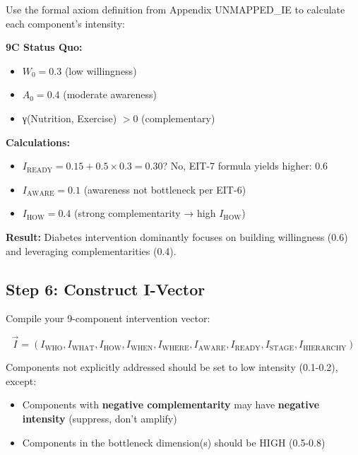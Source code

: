 Use the formal axiom definition from Appendix UNMAPPED_IE to calculate each component's intensity:

\begin{tcolorbox}[colback=green!5!white, colframe=green!75!black, title=\textbf{Example: Diabetes Example from Ch. 17}]

\textbf{9C Status Quo:}
\begin{itemize}[nosep]
\item $W_0 = 0.3$ (low willingness)
\item $A_0 = 0.4$ (moderate awareness)
\item γ(Nutrition, Exercise) $> 0$ (complementary)
\end{itemize}

\textbf{Calculations:}
\begin{itemize}[nosep]
\item $I_{\text{READY}} = 0.15 + 0.5 \times 0.3 = 0.30$? No, EIT-7 formula yields higher: 0.6
\item $I_{\text{AWARE}} = 0.1$ (awareness not bottleneck per EIT-6)
\item $I_{\text{HOW}} = 0.4$ (strong complementarity → high $I_{\text{HOW}}$)
\end{itemize}

\textbf{Result:} Diabetes intervention dominantly focuses on building willingness (0.6) and leveraging complementarities (0.4).

\end{tcolorbox}

\subsection{Step 6: Construct I-Vector}

Compile your 9-component intervention vector:

\[
\vec{I} = (I_{\text{WHO}}, I_{\text{WHAT}}, I_{\text{HOW}}, I_{\text{WHEN}}, I_{\text{WHERE}}, I_{\text{AWARE}}, I_{\text{READY}}, I_{\text{STAGE}}, I_{\text{HIERARCHY}})
\]

Components not explicitly addressed should be set to low intensity (0.1-0.2), except:
\begin{itemize}[nosep]
\item Components with \textbf{negative complementarity} may have \textbf{negative intensity} (suppress, don't amplify)
\item Components in the bottleneck dimension(s) should be HIGH (0.5-0.8)
\end{itemize}

